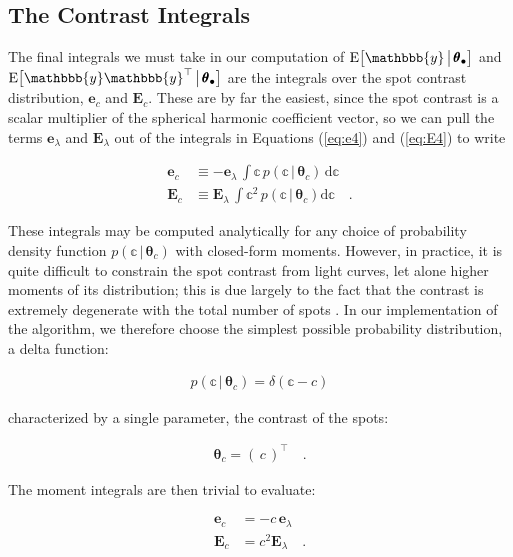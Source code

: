 \documentclass[modern,linenumbers]{aastex62}
\begin{document}
\subsection{The Contrast Integrals}
\label{sec:contrast}
%
The final integrals we must take in our computation of
$\mathrm{E} \big[ \mathbbb{y} \, \big| \, \pmb{\theta}_\bullet \big]$
and $\mathrm{E} \big[ \mathbbb{y} \mathbbb{y}^\top \, \big| \, \pmb{\theta}_\bullet \big]$
are the integrals over
the spot contrast distribution, $\mathbf{e}_c$ and $\mathbf{E}_c$.
These are by far the easiest, since the spot contrast is a scalar
multiplier of the spherical harmonic coefficient vector, so we can
pull the terms $\mathbf{e}_\lambda$ and $\mathbf{E}_\lambda$ out
of the
integrals in Equations (\ref{eq:e4}) and (\ref{eq:E4}) to write
%
\begin{linenomath}\begin{align}
        \mathbf{e}_c
         & \equiv
        -
        \mathbf{e}_\lambda \,
        \int
        \mathbb{c} \,
        p(\mathbb{c} \, \big| \, \pmb{\theta}_{c}) \,
        \mathrm{d}\mathbb{c}
        \\
        \mathbf{E}_c
         & \equiv
        \mathbf{E}_\lambda \,
        \int
        \mathbb{c}^2 \,
        p(\mathbb{c} \, \big| \, \pmb{\theta}_c)
        \mathrm{d}\mathbb{c}
        \quad.
    \end{align}\end{linenomath}
%
These integrals may be computed analytically for any choice of
probability density function $p(\mathbb{c} \, \big| \, \pmb{\theta}_c)$
with closed-form moments.
%
However, in practice, it is quite difficult to constrain the
spot contrast from light curves, let alone higher moments of its
distribution; this is due largely to the fact that the contrast
is extremely degenerate with the total number of spots
.
%
In our implementation of the algorithm,
we therefore choose the simplest possible probability distribution,
a delta function:
%
\begin{linenomath}\begin{align}
        p(\mathbb{c} \, \big| \, \pmb{\theta}_{c}) = \delta(\mathbb{c} - c)
    \end{align}\end{linenomath}
%
characterized by a single parameter, the contrast of the spots:
%
\begin{linenomath}\begin{align}
        \pmb{\theta}_c = \left( \, c \, \right)^\top
        \quad.
    \end{align}\end{linenomath}
%
The moment integrals are then trivial to evaluate:
%
\begin{linenomath}\begin{align}
        \label{eq:ec}
        \mathbf{e}_c & = - c \, \mathbf{e}_\lambda
        \\
        \label{eq:bigEc}
        \mathbf{E}_c & = c^2 \mathbf{E}_\lambda
        \quad.
    \end{align}\end{linenomath}
%
\end{document}
